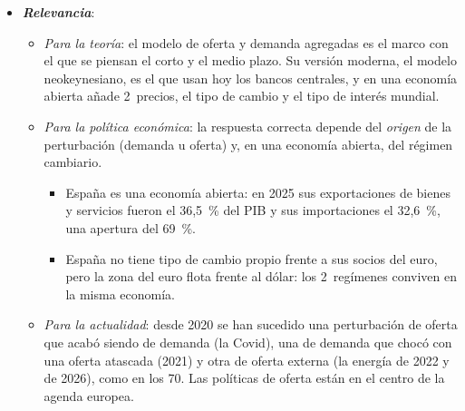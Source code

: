 \documentclass[11pt]{article}
\begin{document}
\begin{itemize}
\item \textbf{\emph{Relevancia}}:
  \begin{itemize}
  \item \emph{Para la teoría}: el modelo de oferta y demanda agregadas es el marco con el que se piensan el corto y el medio plazo. Su versión moderna, el modelo neokeynesiano, es el que usan hoy los bancos centrales, y en una economía abierta añade 2~precios, el tipo de cambio y el tipo de interés mundial.
  \item \emph{Para la política económica}: la respuesta correcta depende del \emph{origen} de la perturbación (demanda u oferta) y, en una economía abierta, del régimen cambiario.
    \begin{itemize}
    \item España es una economía abierta: en 2025 sus exportaciones de bienes y servicios fueron el 36,5~\% del PIB y sus importaciones el 32,6~\%, una apertura del 69~\%\nocite{INE2026CNA2025,Eurostat2026nama10gdp}.
    \item España no tiene tipo de cambio propio frente a sus socios del euro, pero la zona del euro flota frente al dólar: los 2~regímenes conviven en la misma economía.
    \end{itemize}
  \item \emph{Para la actualidad}: desde 2020 se han sucedido una perturbación de oferta que acabó siendo de demanda (la Covid), una de demanda que chocó con una oferta atascada (2021) y otra de oferta externa (la energía de 2022 y de 2026), como en los 70. Las políticas de oferta están en el centro de la agenda europea\nocite{CE2024Draghi}.
  \end{itemize}


\end{itemize}
\end{document}
